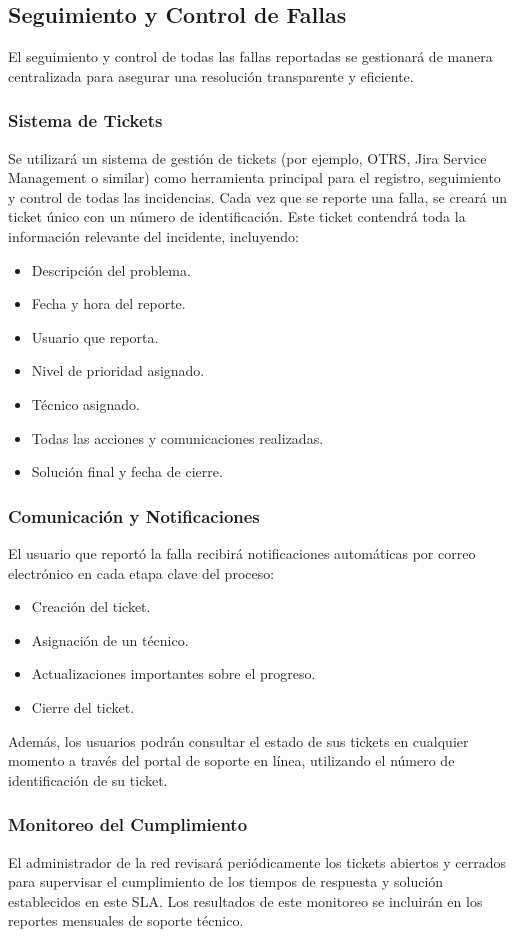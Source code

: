 \subsection{Seguimiento y Control de Fallas}

El seguimiento y control de todas las fallas reportadas se gestionará de manera centralizada para asegurar una resolución transparente y eficiente.

\subsubsection{Sistema de Tickets}
Se utilizará un sistema de gestión de tickets (por ejemplo, OTRS, Jira Service Management o similar) como herramienta principal para el registro, seguimiento y control de todas las incidencias. Cada vez que se reporte una falla, se creará un ticket único con un número de identificación. Este ticket contendrá toda la información relevante del incidente, incluyendo:
\begin{itemize}
    \item Descripción del problema.
    \item Fecha y hora del reporte.
    \item Usuario que reporta.
    \item Nivel de prioridad asignado.
    \item Técnico asignado.
    \item Todas las acciones y comunicaciones realizadas.
    \item Solución final y fecha de cierre.
\end{itemize}

\subsubsection{Comunicación y Notificaciones}
El usuario que reportó la falla recibirá notificaciones automáticas por correo electrónico en cada etapa clave del proceso:
\begin{itemize}
    \item Creación del ticket.
    \item Asignación de un técnico.
    \item Actualizaciones importantes sobre el progreso.
    \item Cierre del ticket.
\end{itemize}
Además, los usuarios podrán consultar el estado de sus tickets en cualquier momento a través del portal de soporte en línea, utilizando el número de identificación de su ticket.

\subsubsection{Monitoreo del Cumplimiento}
El administrador de la red revisará periódicamente los tickets abiertos y cerrados para supervisar el cumplimiento de los tiempos de respuesta y solución establecidos en este SLA. Los resultados de este monitoreo se incluirán en los reportes mensuales de soporte técnico.
